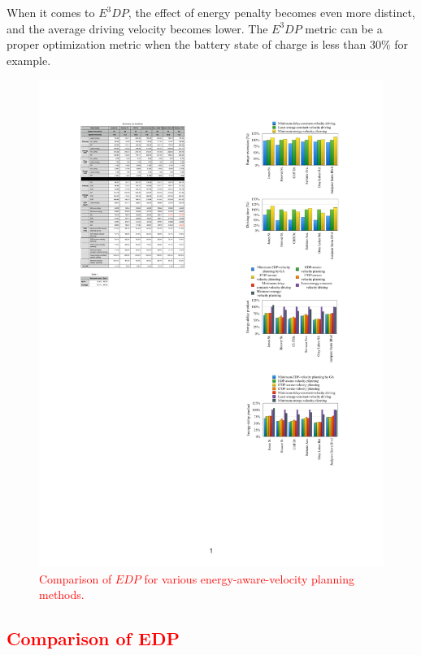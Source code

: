 \documentclass{IEEEtran}
\begin{document}
When it comes to $E^3DP$, the effect of energy penalty becomes even more distinct, and the average driving velocity becomes lower. 
The $E^3DP$ metric can be a proper optimization metric when the battery state of charge is less than 30\% for example.

\begin{figure}	 %
\centering
\includegraphics[width=\hsize]{Figures/EDP_comp_bar.pdf}
\caption{\textcolor{red}{Comparison of $EDP$ for various energy-aware-velocity planning methods.}}
\label{fig:EDP_bar}
\end{figure} 

\textcolor{red}{\subsection{Comparison of EDP}}
\end{document}
